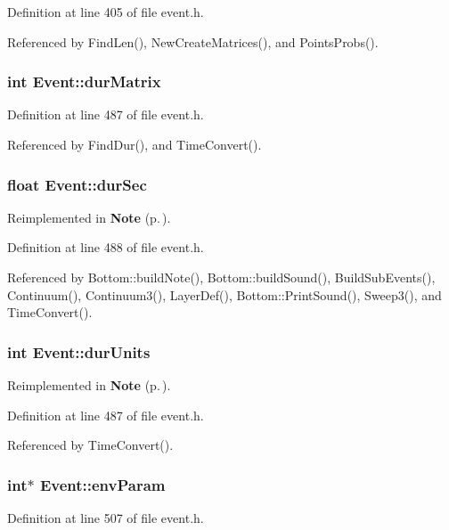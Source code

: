Definition at line 405 of file event.h.

Referenced by Find\-Len(), New\-Create\-Matrices(), and Points\-Probs().
\subsubsection{\setlength{\rightskip}{0pt plus 5cm}int {\bf Event::dur\-Matrix}}\label{classEvent_o35}




Definition at line 487 of file event.h.

Referenced by Find\-Dur(), and Time\-Convert().
\subsubsection{\setlength{\rightskip}{0pt plus 5cm}float {\bf Event::dur\-Sec}}\label{classEvent_o39}




Reimplemented in {\bf Note} {\rm (p.\,\pageref{classNote_r7})}.

Definition at line 488 of file event.h.

Referenced by Bottom::build\-Note(), Bottom::build\-Sound(), Build\-Sub\-Events(), Continuum(), Continuum3(), Layer\-Def(), Bottom::Print\-Sound(), Sweep3(), and Time\-Convert().
\subsubsection{\setlength{\rightskip}{0pt plus 5cm}int {\bf Event::dur\-Units}}\label{classEvent_o36}




Reimplemented in {\bf Note} {\rm (p.\,\pageref{classNote_r8})}.

Definition at line 487 of file event.h.

Referenced by Time\-Convert().
\subsubsection{\setlength{\rightskip}{0pt plus 5cm}int$\ast$ {\bf Event::env\-Param}}\label{classEvent_o56}




Definition at line 507 of file event.h.

